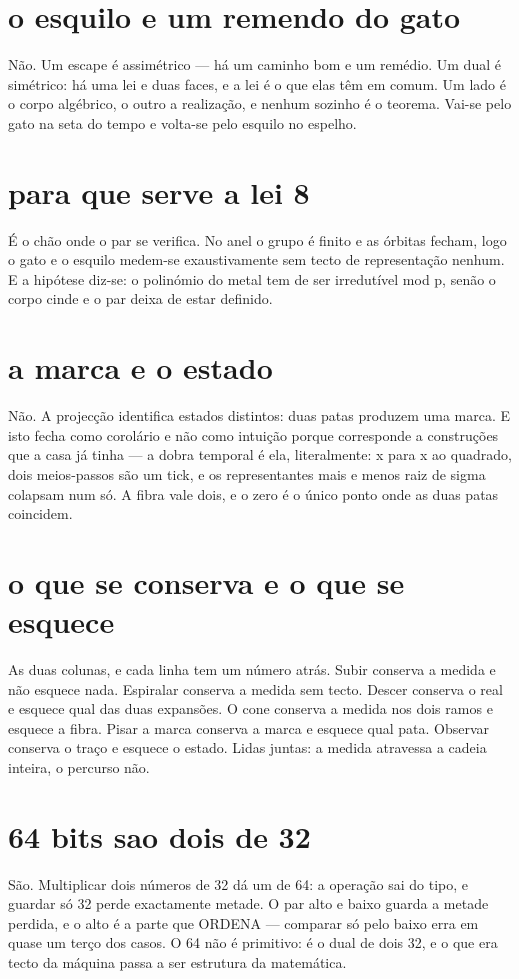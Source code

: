 \documentclass[11pt,a4paper]{article}
\begin{document}
\section{o esquilo e um remendo do gato}
Não. Um escape é assimétrico — há um caminho bom e um remédio. Um dual é simétrico: há
uma lei e duas faces, e a lei é o que elas têm em comum. Um lado é o corpo algébrico, o
outro a realização, e nenhum sozinho é o teorema. Vai-se pelo gato na seta do tempo e
volta-se pelo esquilo no espelho.

\section{para que serve a lei 8}
É o chão onde o par se verifica. No anel o grupo é finito e as órbitas fecham, logo o
gato e o esquilo medem-se exaustivamente sem tecto de representação nenhum. E a hipótese
diz-se: o polinómio do metal tem de ser irredutível mod p, senão o corpo cinde e o par
deixa de estar definido.

\section{a marca e o estado}
Não. A projecção identifica estados distintos: duas patas produzem uma marca. E isto
fecha como corolário e não como intuição porque corresponde a construções que a casa já
tinha — a dobra temporal é ela, literalmente: x para x ao quadrado, dois meios-passos são
um tick, e os representantes mais e menos raiz de sigma colapsam num só. A fibra vale
dois, e o zero é o único ponto onde as duas patas coincidem.

\section{o que se conserva e o que se esquece}
As duas colunas, e cada linha tem um número atrás. Subir conserva a medida e não esquece
nada. Espiralar conserva a medida sem tecto. Descer conserva o real e esquece qual das
duas expansões. O cone conserva a medida nos dois ramos e esquece a fibra. Pisar a marca
conserva a marca e esquece qual pata. Observar conserva o traço e esquece o estado. Lidas
juntas: a medida atravessa a cadeia inteira, o percurso não.

\section{64 bits sao dois de 32}
São. Multiplicar dois números de 32 dá um de 64: a operação sai do tipo, e guardar só 32
perde exactamente metade. O par alto e baixo guarda a metade perdida, e o alto é a parte
que ORDENA — comparar só pelo baixo erra em quase um terço dos casos. O 64 não é
primitivo: é o dual de dois 32, e o que era tecto da máquina passa a ser estrutura da
matemática.
\end{document}
